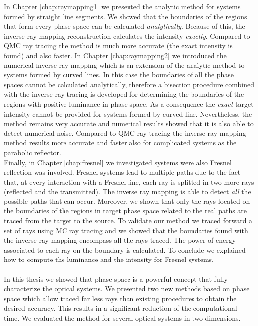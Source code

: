 In Chapter \ref{chap:raymapping1} we presented the analytic method for systems formed by straight line segments. We showed that the boundaries of the regions that form every phase space can be calculated \textit{analytically}. Because of this, the inverse ray mapping reconstruction calculates the intensity \textit{exactly}. Compared to QMC ray tracing the method is much more accurate (the exact intensity is found) and also faster. In Chapter \ref{chap:raymapping2} we introduced the numerical inverse ray mapping which is an extension of the analytic method to systems formed by curved lines. In this case the boundaries of all the phase spaces cannot be calculated analytically, therefore a bisection procedure combined with the inverse ray tracing is developed for determining the boundaries of the regions with positive luminance in phase space. As a consequence the \textit{exact} target intensity cannot be provided for systems formed by curved line. Nevertheless, the method remains very accurate and numerical results showed that it is also able to detect numerical noise. Compared to QMC ray tracing the inverse ray mapping method results more accurate and faster also for complicated systems as the parabolic reflector. \\ \indent 
Finally, in Chapter \ref{chap:fresnel} we investigated systems were also Fresnel reflection was involved. Fresnel systems lead to multiple paths due to the fact that, at every interaction with a Fresnel line, each ray is splitted in two more rays (reflected and the transmitted). The inverse ray mapping is able to detect \textit{all} the possible paths that can occur. Moreover, we shown that only the rays located on the boundaries of the regions in target phase space related to the real paths are traced from the target to the source. To validate our method we traced forward a set of rays using MC ray tracing and we showed that the boundaries found with the inverse ray mapping encompass all the rays traced. 
The power of energy associated to each ray on the boundary is calculated. 
To conclude we explained how to compute the luminance and the intensity for Fresnel systems. 
\\ \\ \indent In this thesis we showed that phase space is a powerful concept that fully characterize the optical systems. We presented two new methods based on phase space which allow traced far less rays than existing procedures to obtain the desired accuracy. This results in a significant reduction of the computational time. We evaluated the method for several optical systems in two-dimensions.
